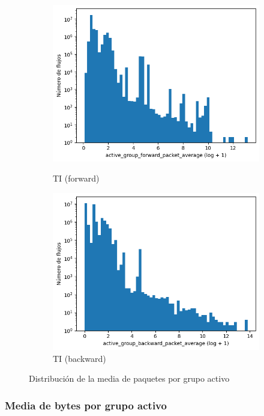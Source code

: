\begin{figure}[H]
\begin{subfigure}[b]{0.26\textwidth}
        \includegraphics[width=\linewidth]{media/packet_pincer_toniot/active_group_forward_packet_average_log_x_log_y.png}
        \caption{TI (forward)}
        \includegraphics[width=\linewidth]{media/packet_pincer_toniot/active_group_backward_packet_average_log_x_log_y.png}
        \caption{TI (backward)}
    \end{subfigure}
       \caption{Distribución de la media de paquetes por grupo activo}
       \label{fig:packet_pincer_active_group_packet_average}
\end{figure}

\subsubsection{Media de bytes por grupo activo}

